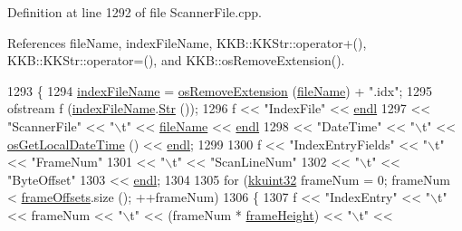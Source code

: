 Definition at line 1292 of file Scanner\+File.\+cpp.



References file\+Name, index\+File\+Name, K\+K\+B\+::\+K\+K\+Str\+::operator+(), K\+K\+B\+::\+K\+K\+Str\+::operator=(), and K\+K\+B\+::os\+Remove\+Extension().


\begin{DoxyCode}
1293 \{
1294   \hyperlink{class_k_k_l_s_c_1_1_scanner_file_a3ef604628bb0a487663326f93845c10e}{indexFileName} = \hyperlink{namespace_k_k_b_a13b1a6f4e074969602dbe4bf9022a9c6}{osRemoveExtension} (\hyperlink{class_k_k_l_s_c_1_1_scanner_file_a1078c1360a71957a3cec77bb675fc144}{fileName}) + \textcolor{stringliteral}{".idx"};
1295   ofstream f (\hyperlink{class_k_k_l_s_c_1_1_scanner_file_a3ef604628bb0a487663326f93845c10e}{indexFileName}.\hyperlink{class_k_k_b_1_1_k_k_str_ad574e6c0fe7f6ce1ba3ab0a8ce2fbd52}{Str} ());
1296   f << \textcolor{stringliteral}{"IndexFile"}                                     << \hyperlink{namespace_k_k_b_ad1f50f65af6adc8fa9e6f62d007818a8}{endl}
1297     << \textcolor{stringliteral}{"ScannerFile"} << \textcolor{stringliteral}{"\(\backslash\)t"} << \hyperlink{class_k_k_l_s_c_1_1_scanner_file_a1078c1360a71957a3cec77bb675fc144}{fileName}               << \hyperlink{namespace_k_k_b_ad1f50f65af6adc8fa9e6f62d007818a8}{endl}
1298     << \textcolor{stringliteral}{"DateTime"}    << \textcolor{stringliteral}{"\(\backslash\)t"} << \hyperlink{namespace_k_k_b_af54c205cde0465bcb2c74f3881a96413}{osGetLocalDateTime} ()  << \hyperlink{namespace_k_k_b_ad1f50f65af6adc8fa9e6f62d007818a8}{endl};
1299 
1300   f << \textcolor{stringliteral}{"IndexEntryFields"} << \textcolor{stringliteral}{"\(\backslash\)t"} << \textcolor{stringliteral}{"FrameNum"}
1301                           << \textcolor{stringliteral}{"\(\backslash\)t"} << \textcolor{stringliteral}{"ScanLineNum"}
1302                           << \textcolor{stringliteral}{"\(\backslash\)t"} << \textcolor{stringliteral}{"ByteOffset"}
1303                           << \hyperlink{namespace_k_k_b_ad1f50f65af6adc8fa9e6f62d007818a8}{endl};
1304 
1305   \textcolor{keywordflow}{for}  (\hyperlink{namespace_k_k_b_af8d832f05c54994a1cce25bd5743e19a}{kkuint32} frameNum = 0;  frameNum < \hyperlink{class_k_k_l_s_c_1_1_scanner_file_a61d36c66bb5f16ba82c088cd816b0c68}{frameOffsets}.size ();  ++frameNum)
1306   \{
1307     f << \textcolor{stringliteral}{"IndexEntry"} << \textcolor{stringliteral}{"\(\backslash\)t"} << frameNum << \textcolor{stringliteral}{"\(\backslash\)t"} << (frameNum * \hyperlink{class_k_k_l_s_c_1_1_scanner_file_a5598193d137fb79782cc1967ec830625}{frameHeight}) << \textcolor{stringliteral}{"\(\backslash\)t"} << 

\end{DoxyCode}
